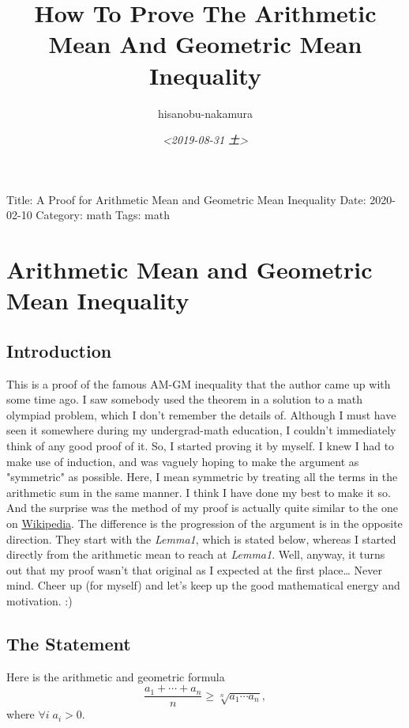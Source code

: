 \documentclass{article}
\author{hisanobu-nakamura}
\date{\textit{<2019-08-31 土>}}
\title{How To Prove The Arithmetic Mean And Geometric Mean Inequality}
\begin{document}
\maketitle
Title: A Proof for Arithmetic Mean and Geometric Mean Inequality
Date: 2020-02-10
Category: math
Tags: math

\section{Arithmetic Mean and Geometric Mean Inequality}
\label{sec-1}
\subsection{Introduction}
\label{sec-1-1}
This is a proof of the famous AM-GM inequality that the author came up with some time ago.
I saw somebody used the theorem in a solution to a math olympiad problem, which I don't remember the details of.
Although I must have seen it somewhere during my undergrad-math education, I couldn't immediately think of any good proof of it.
So, I started proving it by myself.
I knew I had to make use of induction, and was vaguely hoping to make the argument as "symmetric" as possible.
Here, I mean symmetric by treating all the terms in the arithmetic sum in the same manner.
I think I have done my best to make it so.
And the surprise was the method of my proof is actually quite similar to the one on \href{https://en.wikipedia.org/wiki/Inequality_of_arithmetic_and_geometric_means#Proof_by_induction_#2}{Wikipedia}.
The difference is the progression of the argument is in the opposite direction.
They start with the \emph{Lemma1}, which is stated below, whereas I started directly from the arithmetic mean to reach at \emph{Lemma1}.
Well, anyway, it turns out that my proof wasn't that original as I expected at the first place\ldots{}
Never mind. Cheer up (for myself) and let's keep up the good mathematical energy and motivation. :)
\subsection{The Statement}
\label{sec-1-2}
Here is the arithmetic and geometric formula
\begin{equation*}
\label{ }
\frac{a_1 + \cdots + a_n}{n} \ge \sqrt[n]{a_1\cdots a_n},
\end{equation*}
where $\forall i \; a_i > 0$.
\end{document}

